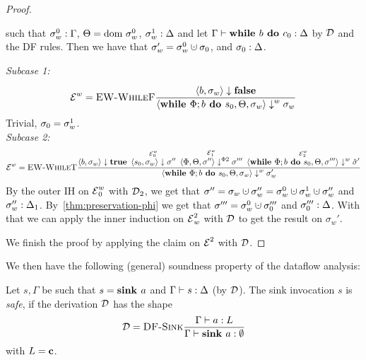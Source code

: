 \begin{proof}
\begin{claim}
        such that ${\sigma_w^0}:{\Gamma}$, $\Theta = \text{dom }{\sigma}^0_w$, ${\sigma_w^1}:{\Delta}$
        and let $\Gamma \vdash {\textbf{while }{b} \textbf{ do } {c_0}}: \Delta$ by $\operatorname{\mathcal{D}}$ and the DF rules.
        Then we have that $\store_w' = \store_w^0 \dunion \store_0$,
        and ${\sigma_0}:{\Delta}$.
    \end{claim}
    \begin{claimproof}
        \emph{Subcase 1:}
        \begin{align*}
            \operatorname{\mathcal{E}}^w = \textsc{EW-WhileF}\frac{\displaystyle 
            \overset{}{\langle b, \sigma_w \rangle \downarrow \textbf{false}}}{\displaystyle \langle \textbf{while }\Phi;{b} \textbf{ do } {s_0}, \Theta, \sigma_w \rangle \downarrow^w \sigma_w}
        \end{align*}
        Trivial, $\sigma_0 = \sigma_w^1$.\\
        \emph{Subcase 2:}
        \begin{align*}
            \operatorname{\mathcal{E}}^w = \textsc{EW-WhileT}\frac{\displaystyle \overset{}{\langle b, \sigma_w \rangle \downarrow \textbf{true}} \enskip
            \overset{\operatorname{\mathcal{E}}^w_0}{\langle s_0, \sigma_w \rangle \downarrow \sigma''} \enskip
            \overset{\operatorname{\mathcal{E}}^w_1}{\langle \Phi, \Theta, \sigma'' \rangle \downarrow^{\Phi2} \sigma'''} \enskip
            \overset{\operatorname{\mathcal{E}}^w_2}{\langle \textbf{while }\Phi;{b} \textbf{ do } {s_0}, \Theta, \sigma''' \rangle \downarrow^w \hat{\sigma}'}}{\displaystyle \langle \textbf{while }\Phi;{b} \textbf{ do } {s_0}, \Theta, \sigma_w \rangle \downarrow^w \sigma_w'}
        \end{align*}
        By the outer IH on $\operatorname{\mathcal{E}}^w_0$ with $\operatorname{\mathcal{D}}_2$, we get that
        $\sigma'' = \sigma_w \dunion \sigma_w'' = \sigma_w^0 \dunion \sigma_w^1 \dunion \sigma_w''$
        and ${\sigma_w''}:{\Delta_1}$.
        By~\autoref{thm:preservation-phi} we get that $\store''' = \store_w^0 \dunion \store_0'''$ and
        ${\sigma_0'''}:{\Delta}$.
        With that we can apply the inner induction on $\operatorname{\mathcal{E}}^2_w$ with $\operatorname{\mathcal{D}}$ to get the result on $\sigma_w'$.
    \end{claimproof}
    We finish the proof by applying the claim on $\operatorname{\mathcal{E}}^2$ with $\operatorname{\mathcal{D}}$.
\end{proof}


We then have the following (general) soundness property of the dataflow analysis:
\begin{definition}
    Let $s, \Gamma$ be such that $s = \textbf{sink }{a}$ and $\Gamma \vdash {s}: \Delta$ (by $\operatorname{\mathcal{D}}$).
    The sink invocation $s$ is \emph{safe}, if the derivation $\operatorname{\mathcal{D}}$ has the shape
    \begin{align*}
        \operatorname{\mathcal{D}} = \textsc{DF-Sink}\frac{\displaystyle \Gamma \vdash {a}: L}{\displaystyle \Gamma \vdash {\textbf{sink }{a}}: \emptyset}
    \end{align*}
    with $L = \textbf{c}$.
\end{definition}

